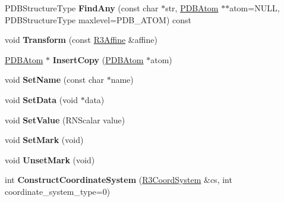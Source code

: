 \begin{DoxyCompactItemize}
\item 
P\+D\+B\+Structure\+Type {\bfseries Find\+Any} (const char $\ast$str, \hyperlink{class_p_d_b_atom}{P\+D\+B\+Atom} $\ast$$\ast$atom=N\+U\+LL, P\+D\+B\+Structure\+Type maxlevel=P\+D\+B\+\_\+\+A\+T\+OM) const \hypertarget{class_p_d_b_residue_a8efe2f747f51ebf581a126a9288f6630}{}\label{class_p_d_b_residue_a8efe2f747f51ebf581a126a9288f6630}

\item 
void {\bfseries Transform} (const \hyperlink{class_r3_affine}{R3\+Affine} \&affine)\hypertarget{class_p_d_b_residue_ad2a04ecfc8d52b406a969fea608690c0}{}\label{class_p_d_b_residue_ad2a04ecfc8d52b406a969fea608690c0}

\item 
\hyperlink{class_p_d_b_atom}{P\+D\+B\+Atom} $\ast$ {\bfseries Insert\+Copy} (\hyperlink{class_p_d_b_atom}{P\+D\+B\+Atom} $\ast$atom)\hypertarget{class_p_d_b_residue_a7d64d62b3cc0f8608e24fa778d3e3b82}{}\label{class_p_d_b_residue_a7d64d62b3cc0f8608e24fa778d3e3b82}

\item 
void {\bfseries Set\+Name} (const char $\ast$name)\hypertarget{class_p_d_b_residue_a1af1140b7afd808baca49b256b30a8f3}{}\label{class_p_d_b_residue_a1af1140b7afd808baca49b256b30a8f3}

\item 
void {\bfseries Set\+Data} (void $\ast$data)\hypertarget{class_p_d_b_residue_a966b929994baa92a2e1d283507c5308e}{}\label{class_p_d_b_residue_a966b929994baa92a2e1d283507c5308e}

\item 
void {\bfseries Set\+Value} (R\+N\+Scalar value)\hypertarget{class_p_d_b_residue_aaa6c3450a56ad0667ff1ad491f815906}{}\label{class_p_d_b_residue_aaa6c3450a56ad0667ff1ad491f815906}

\item 
void {\bfseries Set\+Mark} (void)\hypertarget{class_p_d_b_residue_ab5e3d31c44851fcc0e5eae09750abfb8}{}\label{class_p_d_b_residue_ab5e3d31c44851fcc0e5eae09750abfb8}

\item 
void {\bfseries Unset\+Mark} (void)\hypertarget{class_p_d_b_residue_a24bc9fa0eb10a9e9011da9504bb53402}{}\label{class_p_d_b_residue_a24bc9fa0eb10a9e9011da9504bb53402}

\item 
int {\bfseries Construct\+Coordinate\+System} (\hyperlink{class_r3_coord_system}{R3\+Coord\+System} \&cs, int coordinate\+\_\+system\+\_\+type=0)\hypertarget{class_p_d_b_residue_a451f1bbdf9aae1a53b1b4ba0c56fe745}{}\label{class_p_d_b_residue_a451f1bbdf9aae1a53b1b4ba0c56fe745}

\end{DoxyCompactItemize}
